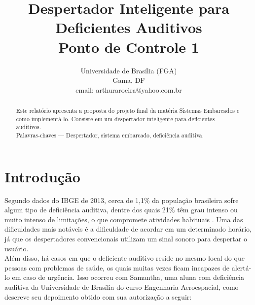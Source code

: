 \documentclass[conference]{IEEEtran}
\begin{document}
\title{ {Despertador Inteligente para Deficientes Auditivos} \\
  {\Large Ponto de Controle 1}}

\author{
Universidade de Brasília (FGA)\\
Gama, DF\\
email: arthuraroeira@yahoo.com.br\\
\and
{}
}
\maketitle
\begin{abstract}
Este relatório apresenta a proposta do projeto final da matéria Sistemas Embarcados e como implementá-lo. Consiste em um despertador inteligente para deficientes auditivos.
\\
Palavras-chaves --- Despertador, sistema embarcado, deficiência auditiva.
\end{abstract}
\IEEEpeerreviewmaketitle

\section{Introdução}
Segundo dados do IBGE de 2013, cerca de 1,1\% da população brasileira sofre algum tipo de deficiência auditiva, dentre dos quais 21\% têm grau intenso ou muito intenso de limitações, o que compromete atividades habituais \cite{mq1}. Uma das dificuldades mais notáveis é a dificuldade de acordar em um determinado horário, já que os despertadores convencionais utilizam um sinal sonoro para despertar o usuário.
\\

Além disso, há casos em que o deficiente auditivo reside no mesmo local do que pessoas com problemas de saúde, os quais muitas vezes ficam incapazes de alertá-lo em caso de urgência. Isso ocorreu com Samantha, uma aluna com deficiência auditiva da Universidade de Brasília do curso Engenharia Aeroespacial, como descreve seu depoimento obtido com sua autorização a seguir:
\\
\end{document}

